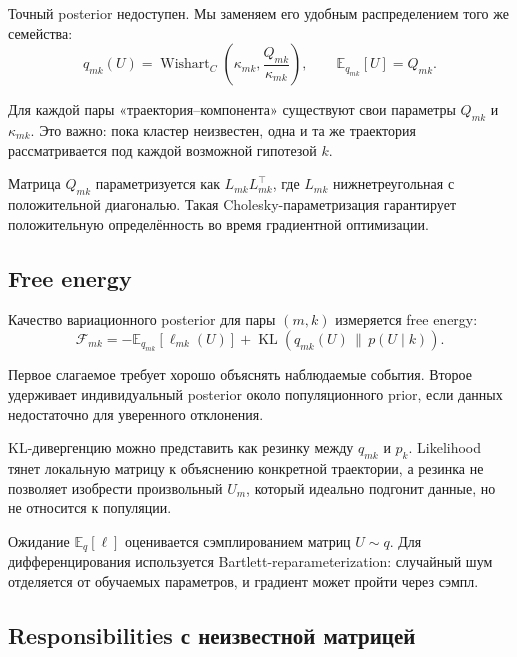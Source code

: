 \documentclass[12pt,a4paper]{article}
\DeclareMathOperator{\Wishart}{Wishart}
\DeclareMathOperator{\KL}{KL}
\newcommand{\E}{\mathbb{E}}
\newenvironment{intuitionbox}{\par\medskip\noindent{\color{blue}\bfseries Интуиция. }\ignorespaces}{\par\medskip}
\begin{document}
Точный posterior недоступен. Мы заменяем его удобным распределением того же семейства:
\begin{equation}
q_{mk}(U)=\Wishart_C\!\left(\kappa_{mk},\frac{Q_{mk}}{\kappa_{mk}}\right),\qquad \E_{q_{mk}}[U]=Q_{mk}.
\label{eq:variational-family}
\end{equation}

Для каждой пары «траектория--компонента» существуют свои параметры \(Q_{mk}\) и \(\kappa_{mk}\). Это важно: пока кластер неизвестен, одна и та же траектория рассматривается под каждой возможной гипотезой \(k\).

Матрица \(Q_{mk}\) параметризуется как \(L_{mk}L_{mk}^\top\), где \(L_{mk}\) нижнетреугольная с положительной диагональю. Такая Cholesky-параметризация гарантирует положительную определённость во время градиентной оптимизации.

\subsection{Free energy}

Качество вариационного posterior для пары \((m,k)\) измеряется free energy:
\begin{equation}
\mathcal F_{mk}=-\E_{q_{mk}}[\ell_{mk}(U)]+\KL\!\left(q_{mk}(U)\,\|\,p(U\mid k)\right).
\label{eq:free-energy}
\end{equation}

Первое слагаемое требует хорошо объяснять наблюдаемые события. Второе удерживает индивидуальный posterior около популяционного prior, если данных недостаточно для уверенного отклонения.

\begin{intuitionbox}
KL-дивергенцию можно представить как резинку между \(q_{mk}\) и \(p_k\). Likelihood тянет локальную матрицу к объяснению конкретной траектории, а резинка не позволяет изобрести произвольный \(U_m\), который идеально подгонит данные, но не относится к популяции.
\end{intuitionbox}

Ожидание \(\E_q[\ell]\) оценивается сэмплированием матриц \(U\sim q\). Для дифференцирования используется Bartlett-reparameterization: случайный шум отделяется от обучаемых параметров, и градиент может пройти через сэмпл.

\subsection{Responsibilities с неизвестной матрицей}
\end{document}
